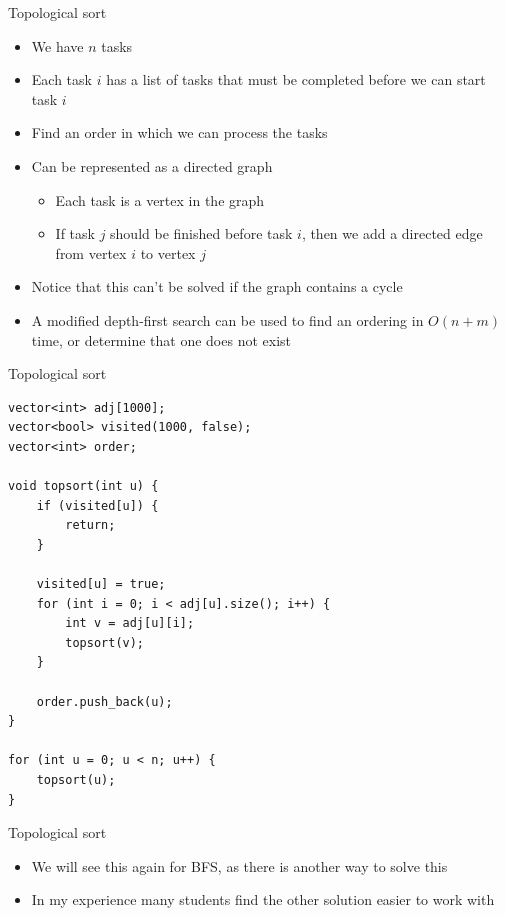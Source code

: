 \documentclass{beamer}
\begin{document}
\begin{frame}[plain]{Topological sort}
    \vspace{5pt}
    \begin{itemize}
        \item We have $n$ tasks
        \item Each task $i$ has a list of tasks that must be completed before we can start task $i$
        \item Find an order in which we can process the tasks
        \vspace{5pt}
        \item Can be represented as a directed graph
            \begin{itemize}
                \item Each task is a vertex in the graph
                \item If task $j$ should be finished before task $i$, then we add a directed edge from vertex $i$ to vertex $j$
            \end{itemize}
        \vspace{5pt}
        \item Notice that this can't be solved if the graph contains a cycle
        \vspace{5pt}
        \item A modified depth-first search can be used to find an ordering in $O(n + m)$ time, or determine that one does not exist
    \end{itemize}
\end{frame}

\begin{frame}{Topological sort}
    \begin{verbatim}
vector<int> adj[1000];
vector<bool> visited(1000, false);
vector<int> order;

void topsort(int u) {
    if (visited[u]) {
        return;
    }

    visited[u] = true;
    for (int i = 0; i < adj[u].size(); i++) {
        int v = adj[u][i];
        topsort(v);
    }

    order.push_back(u);
}

for (int u = 0; u < n; u++) {
    topsort(u);
}
    \end{verbatim}
\end{frame}

\begin{frame}[plain]{Topological sort}
    \vspace{5pt}
    \begin{itemize}
        \item We will see this again for BFS, as there is another way to solve this
        \item In my experience many students find the other solution easier to work with
    \end{itemize}
\end{frame}
\end{document}
